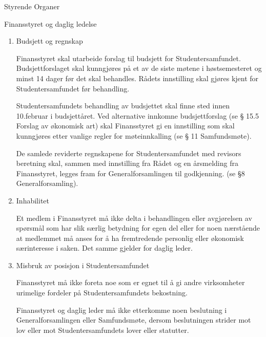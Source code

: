 \begin{lovkapittel}{Styrende Organer}
\begin{lovparagraf}{Finansstyret og daglig ledelse}
\begin{enumerate}
    Daglig leder har rett og plikt til å delta i Finansstyrets behandling av saker og til å uttale seg, med mindre
    annet er bestemt av Finansstyret i den enkelte sak.
    
    I ekstraordinære tilfeller kan saker behandles uten møte dersom samtlige medlemmer av Finansstyret godtar
    dette. Finansstyret kan ikke fatte noe vedtak dersom ikke alle medlemmene har fått anledning til å ta del i
    saksbehandlingen.
    
    Årsregnskap og årsberetning skal behandles i møte.
    
    \item Budsjett og regnskap
    
    Finansstyret skal utarbeide forslag til budsjett for Studentersamfundet. Budsjettforslaget skal kunngjøres på
    et av de siste møtene i høstsemesteret og minst 14 dager før det skal behandles. Rådets innstilling skal gjøres
    kjent for Studentersamfundet før behandling.
    
    Studentersamfundets behandling av budsjettet skal finne sted innen 10.februar i budsjettåret. Ved alternative
    innkomne budsjettforslag (se § 15.5 Forslag av økonomisk art) skal Finansstyret gi en innstilling som skal
    kunngjøres etter vanlige regler for møteinnkalling (se § 11 Samfundsmøte).
    
    De samlede reviderte regnskapene for Studentersamfundet med revisors beretning skal, sammen med
    innstilling fra Rådet og en årsmelding fra Finansstyret, legges fram for Generalforsamlingen til godkjenning.
    (se §8 Generalforsamling).
    
    \item Inhabilitet
    
    Et medlem i Finansstyret må ikke delta i behandlingen eller avgjørelsen av spørsmål som har slik særlig
    betydning for egen del eller for noen nærstående at medlemmet må anses for å ha fremtredende personlig
    eller økonomisk særinteresse i saken. Det samme gjelder for daglig leder.
    
    \item Misbruk av posisjon i Studentersamfundet
    
    Finansstyret må ikke foreta noe som er egnet til å gi andre virksomheter urimelige fordeler på
    Studentersamfundets bekostning.
    
    Finansstyret og daglig leder må ikke etterkomme noen beslutning i Generalforsamlingen eller
    Samfundsmøte, dersom beslutningen strider mot lov eller mot Studentersamfundets lover eller statutter.
    

\end{enumerate}
\end{lovparagraf}
\end{lovkapittel}

